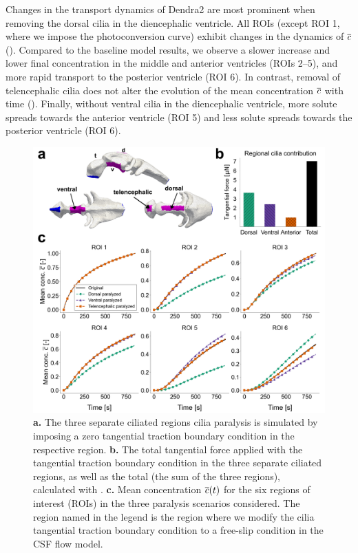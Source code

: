 \documentclass{WileyMSP-template}
\begin{document}
Changes in the transport dynamics of Dendra2 are most prominent when removing the dorsal cilia
in the diencephalic ventricle. All ROIs (except ROI 1, where we impose the photoconversion curve)
exhibit changes in the dynamics of $\overline{c}$ ().
Compared to the baseline model results, we observe a slower increase and lower final concentration
in the middle and anterior ventricles (ROIs 2--5),
and more rapid transport to the posterior ventricle (ROI 6).
In contrast, removal of telencephalic cilia does not alter the evolution of the
mean concentration $\overline{c}$ with time ().
Finally, without ventral cilia in the diencephalic ventricle,
more solute spreads towards the anterior ventricle (ROI 5) and
less solute spreads towards the posterior ventricle (ROI 6).
\begin{figure}[H]
    \centering
    \includegraphics[width=\textwidth]{graphics/figure5_compare_cilia_modifications.png}
    \caption{\textbf{a.} The three separate ciliated regions cilia paralysis is simulated
    by imposing a zero tangential traction boundary condition in the respective region.
    \textbf{b.} The total tangential force applied with the tangential traction
    boundary condition in the three separate ciliated regions, as well as the total
    (the sum of the three regions), calculated with . 
    \textbf{c.} Mean concentration $\overline{c}(t)$ for the six regions of interest (ROIs) in the three 
    paralysis scenarios considered. The region named in the legend is the region
    where we modify the cilia tangential traction boundary condition to a free-slip condition
    in the CSF flow model.}
    \label{fig:fig5}
\end{figure}
\end{document}

